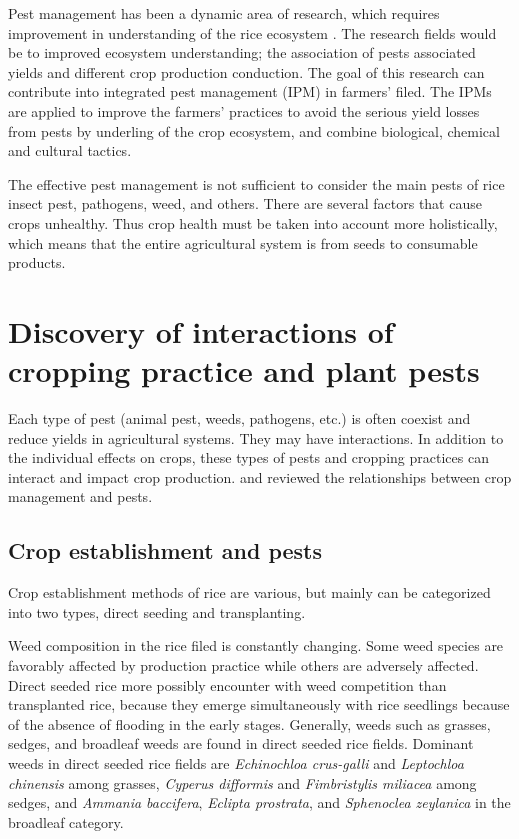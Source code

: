 Pest management has been a dynamic area of research, which requires improvement in understanding of the rice ecosystem \citet{savary}. The research fields would be to improved ecosystem understanding; the association of pests associated yields and different crop production conduction. The goal of this research can contribute into integrated pest management (IPM) in farmers’ filed. The IPMs are applied to improve the farmers’ practices to avoid the serious yield losses from pests by underling of the crop ecosystem, and combine biological, chemical and cultural tactics. 

The effective pest management is not sufficient to consider the main pests of rice insect pest, pathogens, weed, and others. There are several factors that cause crops unhealthy. Thus crop health must be taken into account more holistically, which means that the entire agricultural system is from seeds to consumable products. 

\section*{Discovery of interactions of cropping practice and plant pests}

Each type of pest (animal pest, weeds, pathogens, etc.) is often coexist and reduce yields in agricultural systems. They may have interactions. In addition to the individual effects on crops, these types of pests and cropping practices can interact and impact crop production. \cite{ouricedisease, ho1994weed, cohen1998importance} and \cite{Mew:2004kh} reviewed the relationships between crop management and pests. 

\subsection*{Crop establishment and pests}

Crop establishment methods of rice are various, but mainly can be categorized into two types, direct seeding and transplanting. 

Weed composition in the rice filed is constantly changing. Some weed species are favorably affected by production practice while others are adversely affected. Direct seeded rice  more possibly encounter with weed competition than transplanted rice, because they emerge simultaneously with rice seedlings because of the absence of flooding in the early stages. Generally, weeds such as grasses, sedges, and broadleaf weeds are found in direct seeded rice fields. Dominant weeds in direct seeded rice fields are \textit{Echinochloa crus-galli} and \textit{Leptochloa chinensis} among grasses, \textit{Cyperus difformis} and \textit{Fimbristylis miliacea} among sedges, and \textit{Ammania baccifera}, \textit{Eclipta prostrata}, and \textit{Sphenoclea zeylanica} in the broadleaf category.


